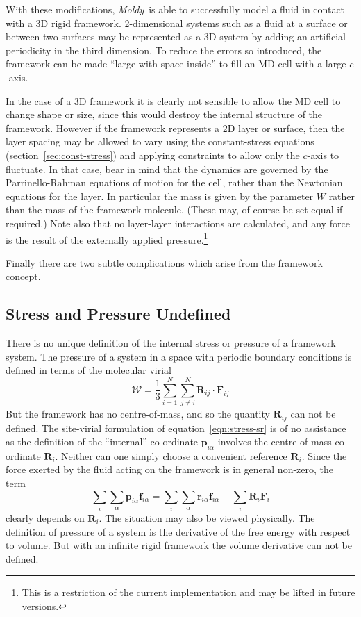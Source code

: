 \documentclass[a4paper,twoside]{report}
\providecommand{\bm}[1]{\mathbf{#1}}
\newcommand{\moldy}{\emph{Moldy}}
\begin{document}
With these modifications, \moldy\ is able to successfully model a fluid
in contact with a 3D rigid framework. 2-dimensional systems such as a
fluid at a surface or between two surfaces may be represented as a 3D
system by adding an artificial periodicity in the third dimension. To
reduce the errors so introduced, the framework can be made ``large
with space inside'' to fill an MD cell with a large $c$-axis.  

In the case of a 3D framework it is clearly not sensible to allow the
MD cell to change shape or size, since this would destroy the internal
structure of the framework.  However if the framework represents a 2D
layer or surface, then the layer spacing may be allowed to vary using
the constant-stress equations (section~\ref{sec:const-stress}) and
applying constraints to allow only the $c$-axis to fluctuate.  In that
case, bear in mind that the dynamics are governed by the
Parrinello-Rahman equations of motion for the cell, rather than the
Newtonian equations for the layer.  In particular the mass is given by
the parameter $W$ rather than the mass of the framework molecule.
(These may, of course be set equal if required.)  Note also that no
layer-layer interactions are calculated, and any force is the result
of the externally applied pressure.\footnote{This is a restriction of
  the current implementation and may be lifted in future versions.}

Finally there are two subtle complications which arise from the
framework concept.

\subsection{Stress and Pressure Undefined}
There is no unique definition of the internal stress or pressure of a
framework system.    The pressure of a system in a space with periodic
boundary conditions  is defined in terms of the molecular virial
\begin{equation}
\label{eqn:virial}
\mathcal{W} = \frac{1}{3} \sum_{i=1}^N \sum_{j \neq i}^N \bm{R}_{ij}
\cdot \bm{F}_{ij}
\end{equation}
But the framework has no centre-of-mass, and so the quantity
$\bm{R}_{ij}$ can not be defined.  The site-virial formulation of
equation~\ref{eqn:stress-sr} is of no assistance as the definition of the
``internal'' co-ordinate $\bm{p}_{i\alpha}$ involves the centre of
mass co-ordinate $\bm{R}_i$.  Neither can one simply choose a
convenient reference $\bm{R}_i$.  Since the force exerted by the fluid
acting on the framework is in general non-zero, the term
\begin{equation}
\sum_i \sum_\alpha \bm{p}_{i\alpha} \bm{f}_{i\alpha}
= \sum_i \sum_\alpha \bm{r}_{i\alpha} \bm{f}_{i\alpha}
- \sum_i \bm{R}_i \bm{F}_i
\end{equation}
clearly depends on $\bm{R}_i$.  The situation may also be viewed
physically.  The definition of pressure of a system is the derivative
of the free energy with respect to volume.  But with an infinite rigid
framework the volume derivative can not be defined.
\end{document}
